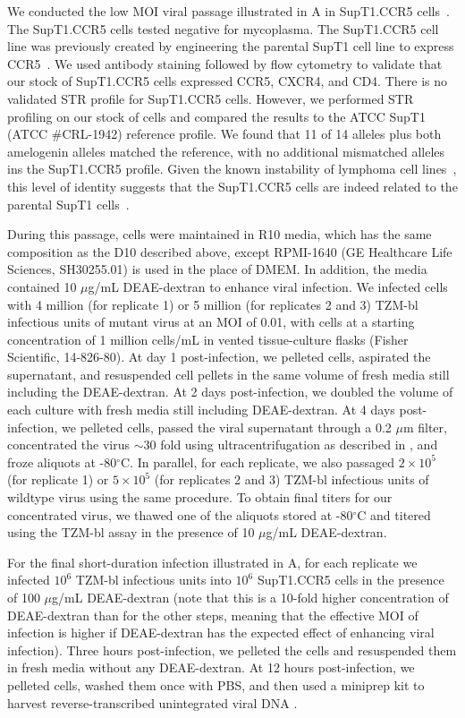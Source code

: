 \documentclass[9pt]{elife}
\begin{document}
We conducted the low MOI viral passage illustrated in A in SupT1.CCR5 cells~\citep[obtained from Dr. James Hoxie;][]{boyd2015mutations}.
The SupT1.CCR5 cells tested negative for mycoplasma. 
The SupT1.CCR5 cell line was previously created by engineering the parental SupT1 cell line to express CCR5~\citep{boyd2015mutations}. 
We used antibody staining followed by flow cytometry to validate that our stock of SupT1.CCR5 cells expressed CCR5, CXCR4, and CD4. 
There is no validated STR profile for SupT1.CCR5 cells. 
However, we performed STR profiling on our stock of cells and compared the results to the ATCC SupT1 (ATCC \#CRL-1942) reference profile. 
We found that 11 of 14 alleles plus both amelogenin alleles matched the reference, with no additional mismatched alleles ins the SupT1.CCR5 profile. 
Given the known instability of lymphoma cell lines~\citep{inoue2000frequent}, this level of identity suggests that the SupT1.CCR5 cells are indeed related to the parental SupT1 cells~\citep{capes2013match}.

During this passage, cells were maintained in R10 media, which has the same composition as the D10 described above, except RPMI-1640 (GE Healthcare Life Sciences, SH30255.01) is used in the place of DMEM.
In addition, the media contained 10 $\mu$g/mL DEAE-dextran to enhance viral infection.
We infected cells with 4 million (for replicate 1) or 5 million (for replicates 2 and 3) TZM-bl infectious units of mutant virus at an MOI of 0.01, with cells at a starting concentration of 1 million cells/mL in vented tissue-culture flasks (Fisher Scientific, 14-826-80).
At day 1 post-infection, we pelleted cells, aspirated the supernatant, and resuspended cell pellets in the same volume of fresh media still including the DEAE-dextran.
At 2 days post-infection, we doubled the volume of each culture with fresh media still including DEAE-dextran.
At 4 days post-infection, we pelleted cells, passed the viral supernatant through a 0.2 $\mu$m filter, concentrated the virus $\sim$30 fold using ultracentrifugation as described in \citet{dingens2017comprehensive}, and froze aliquots at -80$^{\circ}$C.
In parallel, for each replicate, we also passaged $2\times 10^5$ (for replicate 1) or $5 \times 10^5$ (for replicates 2 and 3) TZM-bl infectious units of wildtype virus using the same procedure.
To obtain final titers for our concentrated virus, we thawed one of the aliquots stored at -80$^{\circ}$C and titered using the TZM-bl assay in the presence of 10 $\mu$g/mL DEAE-dextran.

For the final short-duration infection illustrated in A, for each replicate we infected $10^6$ TZM-bl infectious units into $10^6$ SupT1.CCR5 cells in the presence of 100 $\mu$g/mL DEAE-dextran (note that this is a 10-fold higher concentration of DEAE-dextran than for the other steps, meaning that the effective MOI of infection is higher if DEAE-dextran has the expected effect of enhancing viral infection).
Three hours post-infection, we pelleted the cells and resuspended them in fresh media without any DEAE-dextran.
At 12 hours post-infection, we pelleted cells, washed them once with PBS, and then used a miniprep kit to harvest reverse-transcribed unintegrated viral DNA \citep{haddox2016experimental}.
\end{document}
